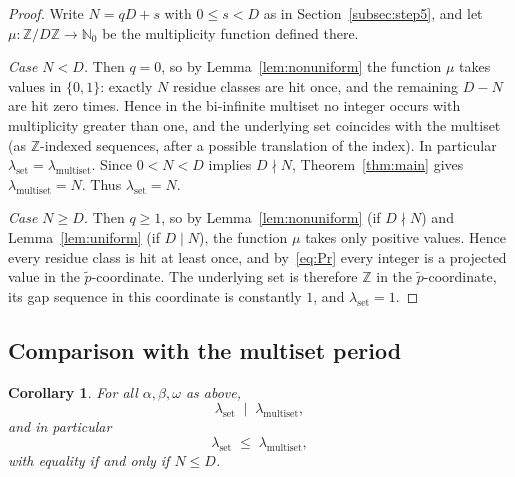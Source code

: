 \documentclass[11pt,reqno]{amsart}
\theoremstyle{plain}
\newtheorem{corollary}[theorem]{Corollary}
\theoremstyle{definition}
\theoremstyle{remark}
\begin{document}
\begin{proof}
Write \(N = qD + s\) with \(0 \le s < D\) as in
Section~\ref{subsec:step5}, and
let \(\mu \colon \mathbb{Z}/D\mathbb{Z} \to \mathbb{N}_0\) be the
multiplicity function defined there.

\smallskip
\noindent\emph{Case \(N < D\).}  Then \(q = 0\), so by
Lemma~\ref{lem:nonuniform} the function \(\mu\) takes values in
\(\{0, 1\}\): exactly \(N\) residue classes are hit once, and the
remaining \(D - N\) are hit zero times.  Hence in the bi-infinite multiset
no integer occurs with multiplicity greater than one, and the underlying
set coincides with the multiset (as \(\mathbb{Z}\)-indexed sequences,
after a possible translation of the index).  In particular
\(\lambda_{\mathrm{set}} = \lambda_{\mathrm{multiset}}\).  Since
\(0 < N < D\) implies \(D \nmid N\), Theorem~\ref{thm:main} gives
\(\lambda_{\mathrm{multiset}} = N\).  Thus
\(\lambda_{\mathrm{set}} = N\).

\smallskip
\noindent\emph{Case \(N \ge D\).}  Then \(q \ge 1\), so by
Lemma~\ref{lem:nonuniform} (if \(D \nmid N\)) and
Lemma~\ref{lem:uniform} (if \(D \mid N\)), the function \(\mu\) takes
only positive values.  Hence every residue class is hit at least once,
and by~\eqref{eq:Pr} every integer is a projected value in the
\(\tilde{p}\)-coordinate.  The underlying set is therefore \(\mathbb{Z}\)
in the \(\tilde{p}\)-coordinate, its gap sequence in this coordinate is
constantly \(1\), and \(\lambda_{\mathrm{set}} = 1\).
\qedhere
\end{proof}

\subsection{Comparison with the multiset period}

\begin{corollary}\label{cor:setlemultiset}
For all \(\alpha, \beta, \omega\) as above,
\[
    \lambda_{\mathrm{set}} \;\mid\; \lambda_{\mathrm{multiset}},
\]
and in particular
\[
    \lambda_{\mathrm{set}} \;\le\; \lambda_{\mathrm{multiset}},
\]
with equality if and only if \(N \le D\).
\end{corollary}
\end{document}
